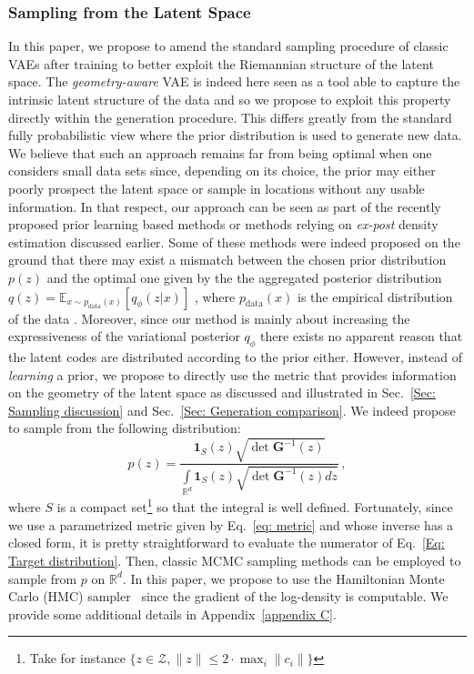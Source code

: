 \documentclass[10pt,journal,compsoc]{IEEEtran}
\begin{document}
    \subsubsection{Sampling from the Latent Space}\label{Sec: Sampling proposal}
    In this paper, we propose to amend the standard sampling procedure of classic VAEs after training to better exploit the Riemannian structure of the latent space. The \emph{geometry-aware} VAE is indeed here seen as a tool able to capture the intrinsic latent structure of the data and so we propose to exploit this property directly within the generation procedure. This differs greatly from the standard fully probabilistic view where the prior distribution is used to generate new data. We believe that such an approach remains far from being optimal when one considers small data sets since, depending on its choice, the prior may either poorly prospect the latent space or sample in locations without any usable information. In that respect, our approach can be seen as part of the recently proposed prior learning based methods or methods relying on \emph{ex-post} density estimation discussed earlier. Some of these methods were indeed proposed on the ground that there may exist a mismatch between the chosen prior distribution $p(z)$ and the optimal one given by the the aggregated posterior distribution $q(z) = \mathbb{E}_{x \sim p_{\mathrm{data}}(x)} [q_{\phi}(z|x)] $ \cite{hoffman_elbo_2016, dai_diagnosing_2018, bauer_resampled_2019, ghosh_variational_2020}, where $p_{\mathrm{data}}(x)$ is the empirical distribution of the data \cite{tomczak_vae_2018}. Moreover, since our method is mainly about increasing the expressiveness of the variational posterior $q_{\phi}$ there exists no apparent reason that the latent codes are distributed according to the prior either. However, instead of \emph{learning} a prior, we propose to directly use the metric that provides information on the geometry of the latent space as discussed and illustrated in Sec.~\ref{Sec: Sampling discussion} and Sec.~\ref{Sec: Generation comparison}. We indeed propose to sample from the following distribution:
    \begin{equation}\label{Eq: Target distribution}
    p(z) = \frac{\mathbf{1}_S(z) \sqrt{\det \mathbf{G}^{-1}(z)}}{\int \limits _{\mathbb{R}^d} \mathbf{1}_S(z) \sqrt{\det \mathbf{G}^{-1}(z) dz}}\,,
    \end{equation}
    where $S$ is a compact set\footnote{Take for instance $\{z \in \mathcal{Z}, \lVert z \rVert \leq 2 \cdot \max_i \lVert c_i \rVert \}$} so that the integral is well defined. Fortunately, since we use a parametrized metric given by Eq.~\eqref{eq: metric} and whose inverse has a closed form, it is pretty straightforward to evaluate the numerator of Eq.~\eqref{Eq: Target distribution}. Then, classic MCMC sampling methods can be employed to sample from $p$ on $\mathbb{R}^d$. In this paper, we propose to use the Hamiltonian Monte Carlo (HMC) sampler~\cite{neal_hamiltonian_2005} since the gradient of the log-density is computable. We provide some additional details in Appendix~\ref{appendix C}. 
\end{document}
